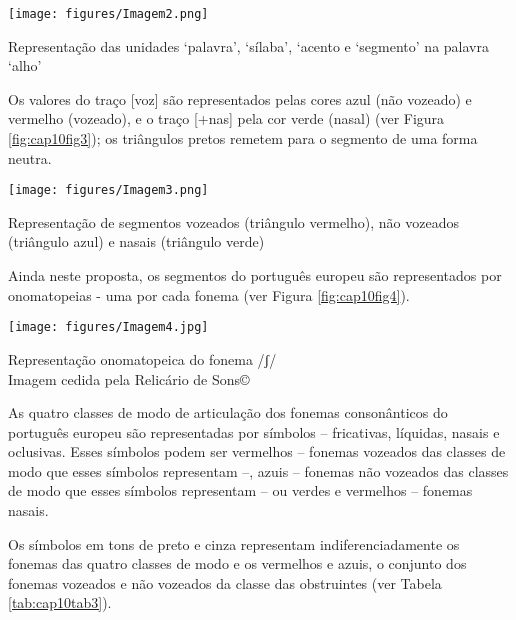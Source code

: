 \documentclass[output=paper,colorlinks,citecolor=brown,booklanguage=portuguese]{langscibook}
\begin{document}
\begin{Figura}
    \centering
    \texttt{[image: figures/Imagem2.png]}


    \caption{{Representação das unidades ‘palavra’, ‘sílaba’, ‘acento e ‘segmento’ na palavra ‘alho’}}
    \label{fig:cap10fig2}
\end{Figura}


Os valores do traço [voz] são representados pelas cores azul (não vozeado) e vermelho (vozeado), e o traço [+nas] pela cor verde (nasal) (ver Figura \ref{fig:cap10fig3}); os triângulos pretos remetem para o segmento de uma forma neutra.


\begin{Figura}
    \centering
    \texttt{[image: figures/Imagem3.png]}


    \caption{{Representação de segmentos vozeados (triângulo vermelho), não vozeados (triângulo azul) e nasais (triângulo verde)}}
    \label{fig:cap10fig3}
\end{Figura}


Ainda neste proposta, os segmentos do português europeu são representados por onomatopeias - uma por cada fonema (ver Figura \ref{fig:cap10fig4}). 


\begin{Figura}
    \texttt{[image: figures/Imagem4.jpg]}
    \caption{Representação onomatopeica do fonema /ʃ/\\
    \centering Imagem cedida pela Relicário de Sons©}
    \label{fig:cap10fig4}
\end{Figura}


As quatro classes de modo de articulação dos fonemas consonânticos do português europeu são representadas por símbolos -- fricativas, líquidas, nasais e oclusivas. Esses símbolos podem ser vermelhos -- fonemas vozeados das classes de modo que esses símbolos representam --, azuis -- fonemas não vozeados das classes de modo que esses símbolos representam -- ou verdes e vermelhos – fonemas nasais. 

Os símbolos em tons de preto e cinza representam indiferenciadamente os fonemas das quatro classes de modo e os vermelhos e azuis, o conjunto dos fonemas vozeados e não vozeados da classe das obstruintes (ver Tabela \ref{tab:cap10tab3}).
\end{document}
